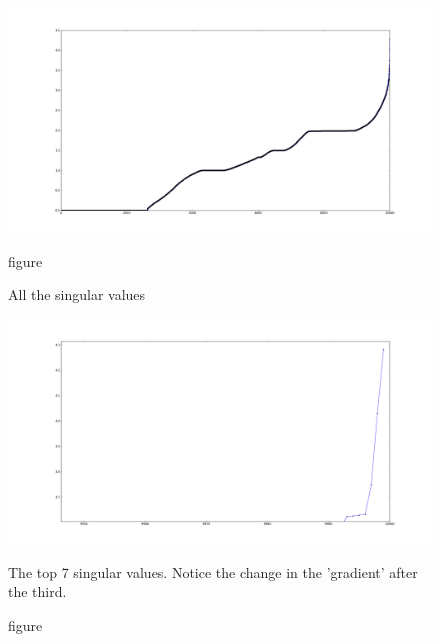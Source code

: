 \documentclass{article}
\begin{document}
	\begin{figure}[h]
		\centering
		\begin{minipage}{.50\textwidth}
			\centering
			\includegraphics[width=\linewidth, scale=0.2]{imgs/svd_2.png}
			\caption{figure}{All the singular values}
		\end{minipage}
		\begin{minipage}{.50\textwidth}
			\centering
			\includegraphics[width=\linewidth, scale=0.2]{imgs/svd_1.png}
			\caption{figure}{The top 7 singular values. Notice the change in the 'gradient' after the third.}
		\end{minipage}
	\end{figure}
	
\end{document}
